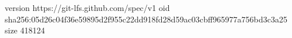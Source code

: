 version https://git-lfs.github.com/spec/v1
oid sha256:05d26c04f36e59895d2f955c22dd918fd28d59ac03cbff965977a756bd3c3a25
size 418124
